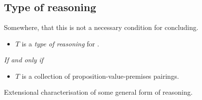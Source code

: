 \chapter{}
\label{cha:typical}

\section{Type of reasoning}
\label{sec:gr-sr}

{
  \color{red}
  Somewhere, that this is not a necessary condition for concluding.
}

\begin{note}
  \begin{definition}
    \label{def:type-r}

    \begin{itemize}
    \item
      \(T\) is a \emph{type of reasoning} for \vAgent{}.
    \end{itemize}

    \emph{If and only if}

    \begin{itemize}
    \item
      \(T\) is a collection of proposition-value-premises pairings.
    \end{itemize}
  \end{definition}

  Extensional characterisation of some general form of reasoning.
\end{note}

